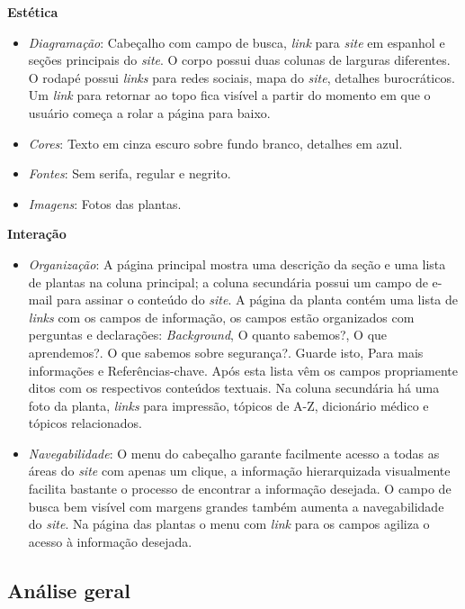 \textbf{Estética}

\begin{itemize}
\item
  \emph{Diagramação}: Cabeçalho com campo de busca, \emph{link} para \emph{site} em espanhol e seções principais do \emph{site}. O corpo possui duas colunas de larguras diferentes. O rodapé possui \emph{links} para redes sociais, mapa do \emph{site}, detalhes burocráticos. Um \emph{link} para retornar ao topo fica visível a partir do momento em que o usuário começa a rolar a página para baixo.
\item
  \emph{Cores}: Texto em cinza escuro sobre fundo branco, detalhes em azul.
\item
  \emph{Fontes}: Sem serifa, regular e negrito.
\item
  \emph{Imagens}: Fotos das plantas.
\end{itemize}

\textbf{Interação}

\begin{itemize}
\item
  \emph{Organização}: A página principal mostra uma descrição da seção e uma lista de plantas na coluna principal; a coluna secundária possui um campo de e-mail para assinar o conteúdo do \emph{site}. A página da planta contém uma lista de \emph{links} com os campos de informação, os campos estão organizados com perguntas e declarações: \emph{Background}, O quanto sabemos?, O que aprendemos?. O que sabemos sobre segurança?. Guarde isto, Para mais informações e Referências-chave. Após esta lista vêm os campos propriamente ditos com os respectivos conteúdos textuais. Na coluna secundária há uma foto da planta, \emph{links} para impressão, tópicos de A-Z, dicionário médico e tópicos relacionados.
\item
  \emph{Navegabilidade}: O menu do cabeçalho garante facilmente acesso a todas as áreas do \emph{site} com apenas um clique, a informação hierarquizada visualmente facilita bastante o processo de encontrar a informação desejada. O campo de busca bem visível com margens grandes também aumenta a navegabilidade do \emph{site}. Na página das plantas o menu com \emph{link} para os campos agiliza o acesso à informação desejada.
\end{itemize}

\subsection{Análise geral}\label{analise-geral}

